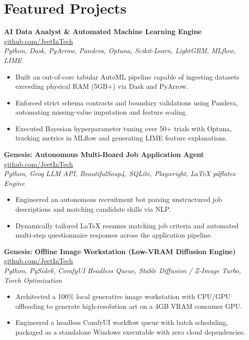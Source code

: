 \documentclass[10pt]{article}
\begin{document}
\section*{Featured Projects}
\textbf{AI Data Analyst \& Automated Machine Learning Engine} \hfill \href{https://github.com/JeetInTech/Ai-data-analyst}{github.com/JeetInTech} \\
\textit{Python, Dask, PyArrow, Pandera, Optuna, Scikit-Learn, LightGBM, MLflow, LIME}
\begin{itemize}
    \item Built an out-of-core tabular AutoML pipeline capable of ingesting datasets exceeding physical RAM (5GB+) via Dask and PyArrow.
    \item Enforced strict schema contracts and boundary validations using Pandera, automating missing-value imputation and feature scaling.
    \item Executed Bayesian hyperparameter tuning over 50+ trials with Optuna, tracking metrics in MLflow and generating LIME feature explanations.
\end{itemize}

\vspace{1.5pt}
\textbf{Genesis: Autonomous Multi-Board Job Application Agent} \hfill \href{https://github.com/JeetInTech}{github.com/JeetInTech} \\
\textit{Python, Groq LLM API, BeautifulSoup4, SQLite, Playwright, LaTeX pdflatex Engine}
\begin{itemize}
    \item Engineered an autonomous recruitment bot parsing unstructured job descriptions and matching candidate skills via NLP.
    \item Dynamically tailored LaTeX resumes matching job criteria and automated multi-step questionnaire responses across the application pipeline.
\end{itemize}

\vspace{1.5pt}
\textbf{Genesis: Offline Image Workstation (Low-VRAM Diffusion Engine)} \hfill \href{https://github.com/JeetInTech}{github.com/JeetInTech} \\
\textit{Python, PySide6, ComfyUI Headless Queue, Stable Diffusion / Z-Image Turbo, Torch Optimization}
\begin{itemize}
    \item Architected a 100\% local generative image workstation with CPU/GPU offloading to generate high-resolution art on a 4GB VRAM consumer GPU.
    \item Engineered a headless ComfyUI workflow queue with batch scheduling, packaged as a standalone Windows executable with zero cloud dependencies.
\end{itemize}
\end{document}
